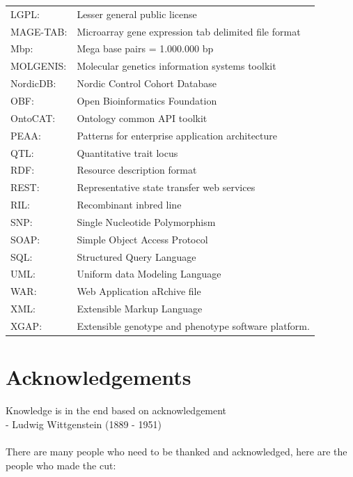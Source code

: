 {\begin{tabular}{ l l }
LGPL:        & Lesser general public license\\
MAGE-TAB:    & Microarray gene expression tab delimited file format\\
Mbp:         & Mega base pairs = 1.000.000 bp \\
MOLGENIS:    & Molecular genetics information systems toolkit\\
NordicDB:    & Nordic Control Cohort Database\\
OBF:         & Open Bioinformatics Foundation\\
OntoCAT:     & Ontology common API toolkit\\
PEAA:        & Patterns for enterprise application architecture\\
QTL:         & Quantitative trait locus\\
RDF:         & Resource description format\\
REST:        & Representative state transfer web services\\
RIL:         & Recombinant inbred line \\
SNP:         & Single Nucleotide Polymorphism\\
SOAP:        & Simple Object Access Protocol\\
SQL:         & Structured Query Language\\
UML:         & Uniform data Modeling Language\\
WAR:         & Web Application aRchive file\\
XML:         & Extensible Markup Language\\
XGAP:        & Extensible genotype and phenotype software platform. 
\end{tabular}
}
\newpage

\section*{Acknowledgements}
Knowledge is in the end based on acknowledgement\\
- Ludwig Wittgenstein (1889 - 1951)\\\\

There are many people who need to be thanked and acknowledged, 
here are the people who made the cut:

